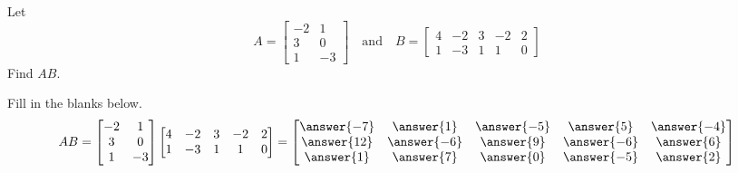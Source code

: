 \documentclass{ximera}
\begin{document}
\begin{example}\label{ex:matmatproduct2} Let
$$A=\begin{bmatrix}-2 & 1\\3 & 0\\1 & -3\end{bmatrix}\quad\text{and}\quad B=\begin{bmatrix}4 & -2 & 3 & -2 &2\\1 & -3 & 1 & 1 &0\end{bmatrix}$$
Find $AB$.
\begin{explanation}
Fill in the blanks below.  
$$AB=\begin{bmatrix}-2 & 1\\3 & 0\\1 & -3\end{bmatrix}\begin{bmatrix}4 & -2 & 3 & -2 &2\\1 & -3 & 1 & 1 &0\end{bmatrix}=\begin{bmatrix}\answer{-7} &\answer{1} & \answer{-5} & \answer{5} & \answer{-4}\\\answer{12} & \answer{-6} & \answer{9} & \answer{-6} & \answer{6}\\\answer{1} & \answer{7} & \answer{0} & \answer{-5} & \answer{2}\end{bmatrix}$$

\end{explanation}
\end{example}
\end{document}
